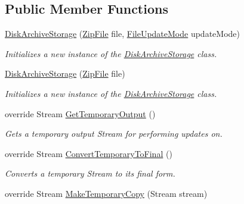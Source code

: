 \subsection*{Public Member Functions}
\begin{DoxyCompactItemize}
\item 
\hyperlink{class_i_c_sharp_code_1_1_sharp_zip_lib_1_1_zip_1_1_disk_archive_storage_a3eb9cf48fc26e29b96cb3e1a7119f546}{Disk\+Archive\+Storage} (\hyperlink{class_i_c_sharp_code_1_1_sharp_zip_lib_1_1_zip_1_1_zip_file}{Zip\+File} file, \hyperlink{namespace_i_c_sharp_code_1_1_sharp_zip_lib_1_1_zip_a626313bc452203ca2bdb092947541027}{File\+Update\+Mode} update\+Mode)
\begin{DoxyCompactList}\small\item\em Initializes a new instance of the \hyperlink{class_i_c_sharp_code_1_1_sharp_zip_lib_1_1_zip_1_1_disk_archive_storage}{Disk\+Archive\+Storage} class. \end{DoxyCompactList}\item 
\hyperlink{class_i_c_sharp_code_1_1_sharp_zip_lib_1_1_zip_1_1_disk_archive_storage_a450194560007dfa524612919eee546b0}{Disk\+Archive\+Storage} (\hyperlink{class_i_c_sharp_code_1_1_sharp_zip_lib_1_1_zip_1_1_zip_file}{Zip\+File} file)
\begin{DoxyCompactList}\small\item\em Initializes a new instance of the \hyperlink{class_i_c_sharp_code_1_1_sharp_zip_lib_1_1_zip_1_1_disk_archive_storage}{Disk\+Archive\+Storage} class. \end{DoxyCompactList}\item 
override Stream \hyperlink{class_i_c_sharp_code_1_1_sharp_zip_lib_1_1_zip_1_1_disk_archive_storage_a5f99f82e221c964f9177c16c7c775e3f}{Get\+Temporary\+Output} ()
\begin{DoxyCompactList}\small\item\em Gets a temporary output Stream for performing updates on. \end{DoxyCompactList}\item 
override Stream \hyperlink{class_i_c_sharp_code_1_1_sharp_zip_lib_1_1_zip_1_1_disk_archive_storage_a90e6fad96f28a6539c5ea2b4a0ac28c0}{Convert\+Temporary\+To\+Final} ()
\begin{DoxyCompactList}\small\item\em Converts a temporary Stream to its final form. \end{DoxyCompactList}\item 
override Stream \hyperlink{class_i_c_sharp_code_1_1_sharp_zip_lib_1_1_zip_1_1_disk_archive_storage_abe8267ae880501446aa0892c8f93a657}{Make\+Temporary\+Copy} (Stream stream)

\end{DoxyCompactItemize}
